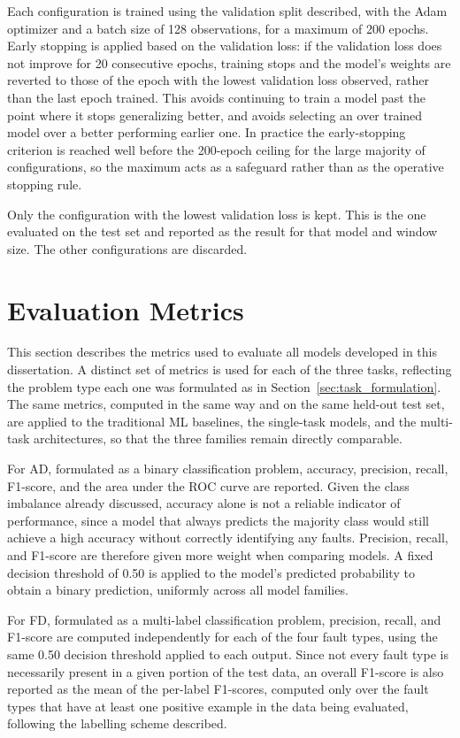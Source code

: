 Each configuration is trained using the validation split described, with the Adam optimizer and a batch
size of 128 observations, for a maximum of 200 epochs. Early stopping is applied based on the validation
loss: if the validation loss does not improve for 20 consecutive epochs, training stops and the model's
weights are reverted to those of the epoch with the lowest validation loss observed, rather than the last
epoch trained. This avoids continuing to train a model past the point where it stops generalizing better,
and avoids selecting an over trained model over a better performing earlier one. In practice the
early-stopping criterion is reached well before the 200-epoch ceiling for the large majority of
configurations, so the maximum acts as a safeguard rather than as the operative stopping rule.

Only the configuration with the lowest validation loss is kept. This is the one evaluated on the test set 
and reported as the result for that model and window size. The other configurations are discarded.

\section{Evaluation Metrics} \label{sec:evaluation_metrics}

This section describes the metrics used to evaluate all models developed in this dissertation. A distinct 
set of metrics is used for each of the three tasks, reflecting the problem type each one was formulated 
as in Section~\ref{sec:task_formulation}. The same metrics, computed in the same way and on the same 
held-out test set, are applied to the traditional ML baselines, the single-task models, and 
the multi-task architectures, so that the three families remain directly comparable.

For AD, formulated as a binary classification problem, 
accuracy, precision, recall, F1-score, and the area under the ROC curve are reported. Given the class 
imbalance already discussed, accuracy alone is not a reliable 
indicator of performance, since a model that always predicts the majority class would still achieve a 
high accuracy without correctly identifying any faults. Precision, recall, and F1-score are therefore 
given more weight when comparing models. A fixed decision threshold of 0.50 is applied to the model's 
predicted probability to obtain a binary prediction, uniformly across all model families.

For FD, formulated as a multi-label classification problem, precision, recall, and F1-score 
are computed independently for each of the four fault types, using the same 0.50 decision threshold 
applied to each output. Since not every fault type is necessarily present in a given portion of the test 
data, an overall F1-score is also reported as the mean of the per-label F1-scores, computed only over the 
fault types that have at least one positive example in the data being evaluated, following the labelling 
scheme described.


